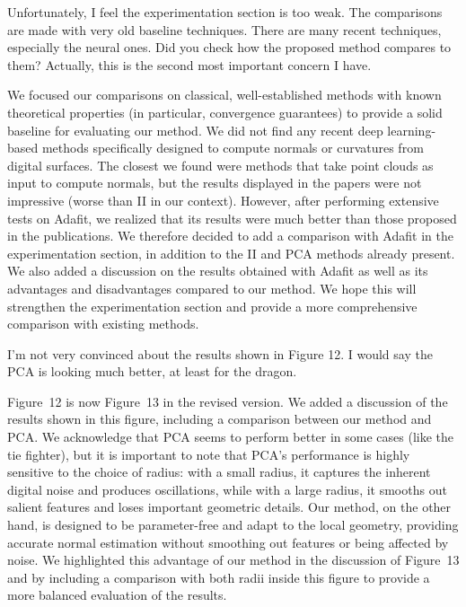\documentclass[10pt,french]{letter}
\begin{document}
  \begin{remark}
    Unfortunately, I feel the experimentation section is too weak. The comparisons
    are made with very old baseline techniques. There are many recent techniques,
    especially the neural ones. Did you check how the proposed method compares to
    them? Actually, this is the second most important concern I have.
  \end{remark}
  \begin{response}
    We focused our comparisons on classical, well-established methods with known theoretical properties
    (in particular, convergence guarantees) to provide a solid baseline for evaluating our method. We did
    not find any recent deep learning-based methods specifically designed to compute normals or curvatures
    from digital surfaces. The closest we found were methods that take point clouds as input to compute
    normals, but the results displayed in the papers were not impressive (worse than II in our context).
    However, after performing extensive tests on Adafit, we realized that its results were much better
    than those proposed in the publications. We therefore decided to add a comparison with Adafit in
    the experimentation section, in addition to the II and PCA methods already present. We also added
    a discussion on the results obtained with Adafit as well as its advantages and disadvantages compared
    to our method. We hope this will strengthen the experimentation section and provide a more comprehensive
    comparison with existing methods.
  \end{response}

  \begin{remark}
    I'm not very convinced about the results shown in Figure 12. I would say the
    PCA is looking much better, at least for the dragon.
  \end{remark}
  \begin{response}
    Figure~12 is now Figure~13 in the revised version. We added a discussion of the results shown in this figure,
    including a comparison between our method and PCA. We acknowledge that PCA seems to perform better in some cases
    (like the tie fighter), but it is important to note that PCA's performance is highly sensitive to the choice of
    radius: with a small radius, it captures the inherent digital noise and produces oscillations, while with a large
    radius, it smooths out salient features and loses important geometric details. Our method, on the other hand, is
    designed to be parameter-free and adapt to the local geometry, providing accurate normal estimation without
    smoothing out features or being affected by noise. We highlighted this advantage of our method in the discussion
    of Figure~13 and by including a comparison with both radii inside this figure to provide a more balanced
    evaluation of the results.
  \end{response}
\end{document}
